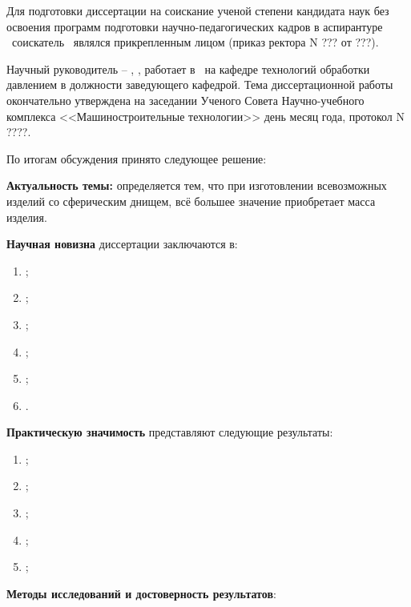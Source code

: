 Для подготовки диссертации на соискание ученой степени кандидата наук без освоения программ подготовки научно-педагогических кадров в аспирантуре \thesisOrganizationShort\ соискатель \thesisSpecialtyNumber~\thesisSpecialtyTitle являлся прикрепленным лицом (приказ ректора N ??? от ???).

Научный руководитель – \supervisorFio, \supervisorRegalia, работает в \thesisOrganizationShort\ на кафедре технологий обработки давлением в должности заведующего кафедрой.
Тема диссертационной работы окончательно утверждена на заседании Ученого Совета Научно-учебного комплекса <<Машиностроительные технологии>> день месяц \thesisYear года, протокол N ????.


По итогам обсуждения принято следующее решение:

\textbf{Актуальность темы:} определяется тем, что при изготовлении всевозможных изделий со сферическим днищем, всё большее значение приобретает масса изделия. \actualitySynText

\textbf{Научная новизна} диссертации заключаются в:
\begin{enumerate}
  \item {\noviznaOne};
  \item {\noviznaTwo};
  \item {\noviznaThree};
  \item {\noviznaFour};
  \item {\noviznaFive};
  \item {\noviznaSix}.
\end{enumerate}

\textbf{Практическую значимость} представляют следующие результаты:
\begin{enumerate}
    \item {\znachimostOne};
    \item {\znachimostTwo};
    \item {\znachimostThree};
    \item {\znachimostFour};
    \item {\znachimostFive};
\end{enumerate}

\textbf{Методы исследований и достоверность результатов}:

